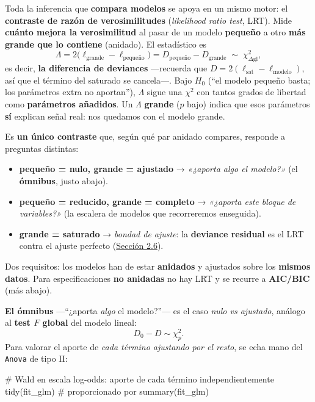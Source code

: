 \documentclass[
  letterpaper,
  DIV=11,
  numbers=noendperiod]{scrartcl}
\newenvironment{Shaded}{\begin{snugshade}}{\end{snugshade}}
\newcommand{\CommentTok}[1]{\textcolor[rgb]{0.37,0.37,0.37}{#1}}
\newcommand{\FunctionTok}[1]{\textcolor[rgb]{0.28,0.35,0.67}{#1}}
\newcommand{\NormalTok}[1]{\textcolor[rgb]{0.00,0.23,0.31}{#1}}
\providecommand{\tightlist}{%
  \setlength{\itemsep}{0pt}\setlength{\parskip}{0pt}}\usepackage{longtable,booktabs,array}
\begin{document}
Toda la inferencia que \textbf{compara modelos} se apoya en un mismo
motor: el \textbf{contraste de razón de verosimilitudes}
(\emph{likelihood ratio test}, LRT). Mide \textbf{cuánto mejora la
verosimilitud} al pasar de un modelo \textbf{pequeño} a otro \textbf{más
grande que lo contiene} (anidado). El estadístico es \[
\Lambda=2\big(\ell_{\text{grande}}-\ell_{\text{pequeño}}\big)=D_{\text{pequeño}}-D_{\text{grande}}\;\sim\;\chi^2_{\Delta\text{gl}},
\] es decir, \textbf{la diferencia de deviances} ---recuerda que
\(D=2(\ell_{\text{sat}}-\ell_{\text{modelo}})\), así que el término del
saturado se cancela---. Bajo \(H_0\) (``el modelo pequeño basta; los
parámetros extra no aportan''), \(\Lambda\) sigue una \(\chi^2\) con
tantos grados de libertad como \textbf{parámetros añadidos}. Un
\(\Lambda\) \textbf{grande} (\(p\) bajo) indica que esos parámetros
\textbf{sí} explican señal real: nos quedamos con el modelo grande.

Es \textbf{un único contraste} que, según qué par anidado compares,
responde a preguntas distintas:

\begin{itemize}
\tightlist
\item
  \textbf{pequeño = nulo, grande = ajustado} → \emph{«¿aporta algo el
  modelo?»} (el \textbf{ómnibus}, justo abajo).
\item
  \textbf{pequeño = reducido, grande = completo} → \emph{«¿aporta este
  bloque de variables?»} (la escalera de modelos que recorreremos
  enseguida).
\item
  \textbf{grande = saturado} → \emph{bondad de ajuste}: la
  \textbf{deviance residual} es el LRT contra el ajuste perfecto
  (\protect\hyperlink{sec-u12-diagnostico}{Sección 2.6}).
\end{itemize}

Dos requisitos: los modelos han de estar \textbf{anidados} y ajustados
sobre los \textbf{mismos datos}. Para especificaciones \textbf{no
anidadas} no hay LRT y se recurre a \textbf{AIC/BIC} (más abajo).

\textbf{El ómnibus} ---``¿aporta \emph{algo} el modelo?''--- es el caso
\emph{nulo vs ajustado}, análogo al \textbf{test \(F\) global} del
modelo lineal: \[D_0-D\sim\chi^2_{p}.\] Para valorar el aporte de
\emph{cada término ajustando por el resto}, se echa mano del
\texttt{Anova} de tipo II:

\begin{Shaded}
\begin{Highlighting}[]
\CommentTok{\# Wald en escala log{-}odds: aporte de cada término independientemente}
\FunctionTok{tidy}\NormalTok{(fit\_glm)  }\CommentTok{\# proporcionado por summary(fit\_glm)}
\end{Highlighting}
\end{Shaded}
\end{document}

